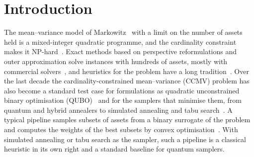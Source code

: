 \section{Introduction}\label{sec:intro}

The mean--variance model of Markowitz~\cite{markowitz1952portfolio} with a limit on the number of assets held is a
mixed-integer quadratic programme, and the cardinality constraint makes it NP-hard~\cite{gao2013optimal}. Exact
methods based on perspective reformulations and outer approximation solve instances with hundreds of assets, mostly
with commercial solvers~\cite{mencarelli2018complex,frangioni2009computational,bertsimas2022scalable}, and heuristics
for the problem have a long tradition~\cite{chang2000heuristics,schaerf2002local}. Over the last decade the
cardinality-constrained mean--variance (CCMV) problem has also become a standard test case for formulations as
quadratic unconstrained binary optimisation (QUBO)~\cite{lucas2014ising,glover2019quantum} and for the samplers that
minimise them, from quantum and hybrid annealers to simulated annealing and tabu
search~\cite{herman2023quantum,venturelli2019reverse,mugel2022dynamic,lozano2026where}. A typical pipeline samples
subsets of assets from a binary surrogate of the problem and computes the weights of the best subsets by convex
optimisation~\cite{morapakula2025endtoend}. With simulated annealing or tabu search as the sampler, such a pipeline is
a classical heuristic in its own right and a standard baseline for quantum samplers.

